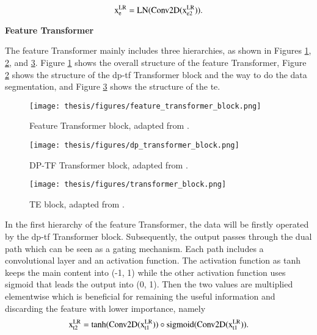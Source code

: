 \begin{equation}
    \centering
    \mathrm{x^{LR}_{e} = LN(Conv2D(x^{LR}_{e2}))}.
    \label{third equation in feature extractor}
\end{equation}

\begin{spacing}{1.5}
\textbf{\large{Feature Transformer}}
\end{spacing}

The feature Transformer mainly includes three hierarchies, as shown in Figures \ref{feature_transformer_block}, \ref{dp_transformer_block}, and \ref{transformer_block}. Figure \ref{feature_transformer_block} shows the overall structure of the feature Transformer, Figure \ref{dp_transformer_block} shows the structure of the \gls{dp}-\gls{tf} Transformer block and the way to do the data segmentation, and Figure \ref{transformer_block} shows the structure of the \gls{te}.

\begin{figure}
	\centering
	\texttt{[image: thesis/figures/feature\_transformer\_block.png]}
	\caption{Feature Transformer block, adapted from \cite{hinderer_blind_2022}.}
	\label{feature_transformer_block}
\end{figure}

\begin{figure}
	\centering
	\texttt{[image: thesis/figures/dp\_transformer\_block.png]}
	\caption{DP-TF Transformer block, adapted from \cite{hinderer_blind_2022}.}
	\label{dp_transformer_block}
\end{figure}

\begin{figure}
	\centering
	\texttt{[image: thesis/figures/transformer\_block.png]}
	\caption{TE block, adapted from \cite{hinderer_blind_2022}.}
	\label{transformer_block}
\end{figure}

In the first hierarchy of the feature Transformer, the data will be firstly operated by the \gls{dp}-\gls{tf} Transformer block. Subsequently, the output passes through the dual path which can be seen as a gating mechanism. Each path includes a convolutional layer and an activation function. The activation function as tanh keeps the main content into (-1, 1) while the other activation function uses sigmoid that leads the output into (0, 1). Then the two values are multiplied elementwise which is beneficial for remaining the useful information and discarding the feature with lower importance, namely
\begin{equation}
    \centering
    \mathrm{x^{LR}_{t2} = tanh(Conv2D(x^{LR}_{t1})) \circ sigmoid(Conv2D(x^{LR}_{t1}))}.
    \label{first equation in feature transformer}
\end{equation}

